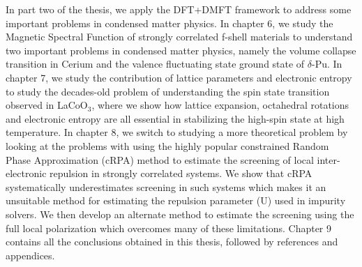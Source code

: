 \documentclass[10pt]{ruthesis}
\begin{document}
{In part two of the thesis, we apply the DFT+DMFT framework to address some important problems in condensed matter physics. In chapter 6, we study the Magnetic Spectral Function of strongly correlated f-shell materials to understand two important problems in condensed matter physics, namely the volume collapse transition in Cerium and the valence fluctuating state ground state of $\delta$-Pu. In chapter 7, we study the contribution of lattice parameters and electronic entropy to study the decades-old problem of understanding the spin state transition observed in LaCoO$_3$, where we show how lattice expansion, octahedral rotations and electronic entropy are all essential in stabilizing the high-spin state at high temperature. In chapter 8, we switch to studying a more theoretical problem by looking at the problems with using the highly popular constrained Random Phase Approximation (cRPA) method to estimate the screening of local inter-electronic repulsion in strongly correlated systems. We show that cRPA systematically underestimates screening in such systems which makes it an unsuitable method for estimating the repulsion parameter (U) used in impurity solvers. We then develop an alternate method to estimate the screening using the full local polarization which overcomes many of these limitations. Chapter 9 contains all  the conclusions obtained in this thesis, followed by references and appendices. 

 
}
\end{document}
